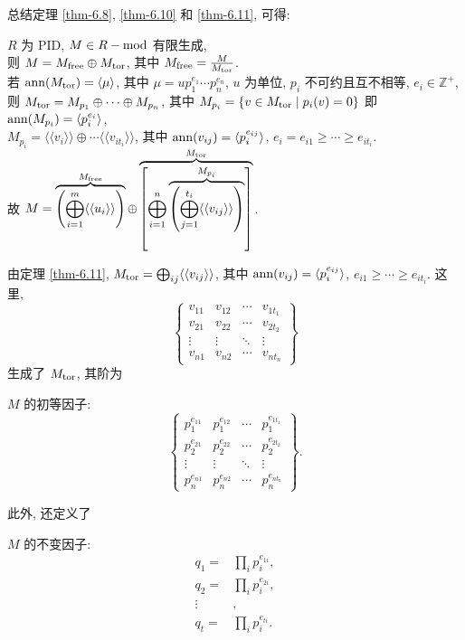 \documentclass{note}
\begin{document}
总结定理 \ref{thm-6.8}, \ref{thm-6.10} 和 \ref{thm-6.11}, 可得:
\begin{thm}[(课本定理 6.12)]
    $R$ 为 PID, $M\in R-\operatorname{mod}$ 有限生成,\\
    则 $M=M_{\operatorname{free}}\oplus M_{\operatorname{tor}}$, 其中 $M_{\operatorname{free}}=\frac{M}{M_{\operatorname{tor}}}$.\\
    若 $\operatorname{ann}(M_{\operatorname{tor}})=\langle\mu\rangle$, 其中 $\mu=up_1^{e_1}\cdots p_n^{e_n}$, $u$ 为单位, $p_i$ 不可约且互不相等, $e_i\in\mathbb{Z}^+$,\\
    则 $M_{\operatorname{tor}}=M_{p_1}\oplus\cdots\oplus M_{p_n}$, 其中 $M_{p_i}=\{v\in M_{\operatorname{tor}}\mid p_i(v)=0\}$ 即 $\operatorname{ann}(M_{p_i})=\langle p_i^{e_i}\rangle$,\\
    $M_{p_i}=\langle\langle v_i\rangle\rangle\oplus\cdots\langle\langle v_{it_i}\rangle\rangle$, 其中 $\operatorname{ann}(v_{ij})=\langle p_i^{e_{ij}}\rangle$, $e_i=e_{i1}\geq\cdots\geq e_{it_i}$.\\
    故 $M=\overbrace{\left(\bigoplus_{i=1}^m\langle\langle u_i\rangle\rangle\right)}^{M_{\operatorname{free}}}\oplus\overbrace{\left[\bigoplus_{i=1}^n\overbrace{\left(\bigoplus_{j=1}^{t_i}\langle\langle v_{ij}\rangle\rangle\right)}^{M_{p_i}}\right]}^{M_{\operatorname{tor}}}$.
\end{thm}

由定理 \ref{thm-6.11}, $M_{\operatorname{tor}}=\bigoplus_{ij}\langle\langle v_{ij}\rangle\rangle$, 其中 $\operatorname{ann}(v_{ij})=\langle p_i^{e_{ij}}\rangle$, $e_{i1}\geq\cdots\geq e_{it_i}$. 这里,
\[
    \begin{Bmatrix}
        v_{11}&v_{12}&\cdots&v_{1t_1}\\
        v_{21}&v_{22}&\cdots&v_{2t_2}\\
        \vdots&\vdots&\ddots&\vdots\\
        v_{n1}&v_{n2}&\cdots&v_{nt_n}
    \end{Bmatrix}
\]
生成了 $M_{\operatorname{tor}}$, 其阶为
\begin{df}[初等因子]
    $M$ 的初等因子:
    \[
        \begin{Bmatrix}
            p_1^{e_{11}}&p_1^{e_{12}}&\cdots&p_1^{e_{1t_1}}\\
            p_2^{e_{21}}&p_2^{e_{22}}&\cdots&p_2^{e_{2t_2}}\\
            \vdots&\vdots&\ddots&\vdots\\
            p_n^{e_{n1}}&p_n^{e_{n2}}&\cdots&p_n^{e_{nt_n}}
        \end{Bmatrix}.
    \]
\end{df}
此外, 还定义了
\begin{df}[不变因子]
    $M$ 的不变因子:
    \begin{align*}
        q_1=&\prod_ip_i^{e_{1i}},\\
        q_2=&\prod_ip_i^{e_{2i}},\\
        \vdots&,\\
        q_t=&\prod_ip_i^{e_{ti}}.
    \end{align*}
\end{df}
\ifx\allfiles\undefined
\end{document}
